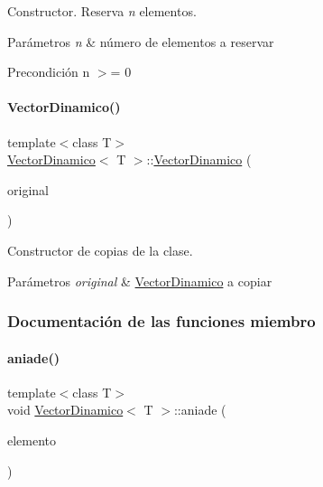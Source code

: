 Constructor. Reserva {\itshape n} elementos. 


\begin{DoxyParams}{Parámetros}
{\em n} & número de elementos a reservar \\
\hline
\end{DoxyParams}
\begin{DoxyPrecond}{Precondición}
n $>$= 0 
\end{DoxyPrecond}
\mbox{\label{classVectorDinamico_ad862884ef998b255129195619d9cb2d6}} 
\paragraph{\texorpdfstring{Vector\+Dinamico()}{VectorDinamico()}\hspace{0.1cm}{\footnotesize\ttfamily [2/2]}}
{\footnotesize\ttfamily template$<$class T$>$ \\
\hyperlink{classVectorDinamico}{Vector\+Dinamico}$<$ T $>$\+::\hyperlink{classVectorDinamico}{Vector\+Dinamico} (\begin{DoxyParamCaption}\item[{const \hyperlink{classVectorDinamico}{Vector\+Dinamico}$<$ T $>$ \&}]{original }\end{DoxyParamCaption})}



Constructor de copias de la clase. 


\begin{DoxyParams}{Parámetros}
{\em original} & {\ttfamily \hyperlink{classVectorDinamico}{Vector\+Dinamico}} a copiar \\
\hline
\end{DoxyParams}


\subsubsection{Documentación de las funciones miembro}
\mbox{\label{classVectorDinamico_a91f46d1d51e0058f456d9ae69ec4e1b8}} 
\paragraph{\texorpdfstring{aniade()}{aniade()}}
{\footnotesize\ttfamily template$<$class T$>$ \\
void \hyperlink{classVectorDinamico}{Vector\+Dinamico}$<$ T $>$\+::aniade (\begin{DoxyParamCaption}\item[{T}]{elemento }\end{DoxyParamCaption})}



